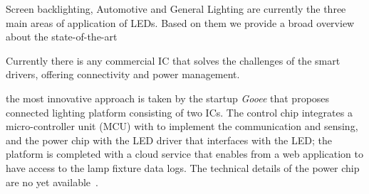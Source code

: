 
Screen backlighting, Automotive and General Lighting are currently the three main areas of application of LEDs. Based on them we provide a broad overview about the state-of-the-art

Currently there is any commercial IC that solves the challenges of the smart drivers, offering connectivity and power management.

the most innovative approach is taken by the startup \emph{Gooee} that proposes connected lighting platform consisting   of two ICs. The control chip integrates a micro-controller unit (MCU) with to implement the communication and sensing, and the power chip with the LED driver that interfaces with the LED; the platform  is completed with a cloud service that enables from a web application to have access to the lamp fixture data logs. The technical details of the power chip are no yet available~\cite{web:Gooee}.

